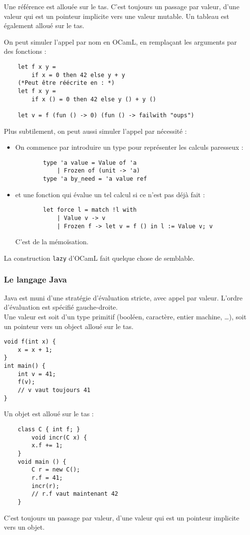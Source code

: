 \documentclass{cours}
\begin{document}
Une référence est allouée sur le tas. C'est toujours un passage par valeur, d'une valeur qui est un pointeur implicite vers une valeur mutable. Un tableau est également alloué sur le tas.

On peut simuler l'appel par nom en OCamL, en remplaçant les arguments par des fonctions :
\begin{verbatim}
    let f x y =
        if x = 0 then 42 else y + y
    (*Peut être réécrite en : *)
    let f x y =
        if x () = 0 then 42 else y () + y ()

    let v = f (fun () -> 0) (fun () -> failwith "oups")
\end{verbatim}

Plus subtilement, on peut aussi simuler l'appel par nécessité :
\begin{itemize}
    \item On commence par introduire un type pour représenter les calculs paresseux :
          \begin{verbatim}
        type 'a value = Value of 'a
            | Frozen of (unit -> 'a)
        type 'a by_need = 'a value ref
    \end{verbatim}
    \item et une fonction qui évalue un tel calcul si ce n'est pas déjà fait :
          \begin{verbatim}
        let force l = match !l with
            | Value v -> v
            | Frozen f -> let v = f () in l := Value v; v
    \end{verbatim}
          C'est de la mémoïsation.
\end{itemize}
\begin{remark}
    La construction \texttt{lazy} d'OCamL fait quelque chose de semblable.
\end{remark}

\subsubsection{Le langage Java}
Java est muni d'une stratégie d'évaluation stricte, avec appel par valeur. L'ordre d'évaluation est spécifié gauche-droite. \\
Une valeur est soit d'un type primitif (booléen, caractère, entier machine, \dots), soit un pointeur vers un object alloué sur le tas.
\begin{verbatim}
void f(int x) {
    x = x + 1;
}
int main() {
    int v = 41;
    f(v);
    // v vaut toujours 41
}
\end{verbatim}
Un objet est alloué sur le tas :
\begin{verbatim}
    class C { int f; }
        void incr(C x) {
        x.f += 1;
    }
    void main () {
        C r = new C();
        r.f = 41;
        incr(r);
        // r.f vaut maintenant 42
    }
\end{verbatim}
C'est toujours un passage par valeur, d'une valeur qui est un pointeur implicite vers un objet.
\end{document}
